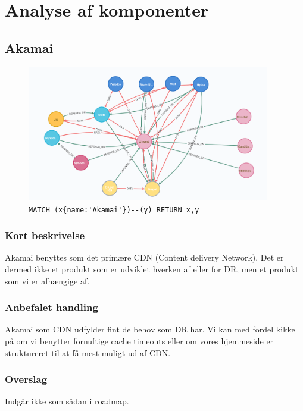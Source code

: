 \documentclass{article}
\begin{document}


\newpage

\section{Analyse af komponenter}

\subsection{Akamai}
\begin{figure}[H]
\includegraphics[width=300pt]{Akamai.PNG}
\cprotect\caption{\verb|MATCH (x{name:'Akamai'})--(y) RETURN x,y|}
\end{figure}
\subsubsection*{Kort beskrivelse}
Akamai benyttes som det primære CDN (Content delivery Network). 
Det er dermed ikke et produkt som er udviklet hverken af eller for DR, 
men et produkt som vi er afhængige af. 
\subsubsection*{Anbefalet handling}
Akamai som CDN udfylder fint de behov som DR har. 
Vi kan med fordel kikke på om vi benytter fornuftige cache timeouts eller om vores hjemmeside er struktureret til at få mest muligt ud af CDN.

\subsubsection*{Overslag}
Indgår ikke som sådan i roadmap.
\end{document}
